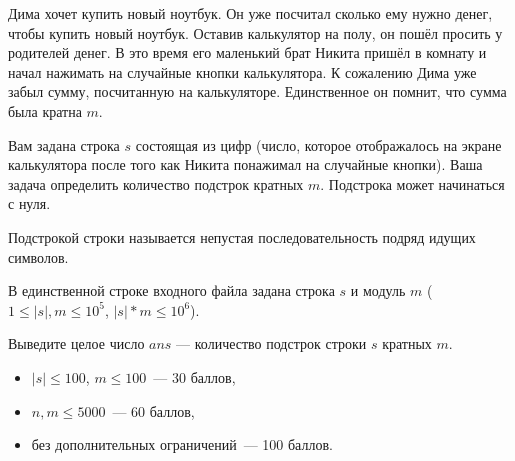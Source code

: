 
\Legend

Дима хочет купить новый ноутбук. Он уже посчитал сколько ему нужно денег, чтобы купить новый ноутбук. Оставив калькулятор на полу, он пошёл просить у родителей денег. В это время его маленький брат Никита пришёл в комнату и начал нажимать на случайные кнопки калькулятора. К сожалению Дима уже забыл сумму, посчитанную на калькуляторе. Единственное он помнит, что сумма была кратна $m$.

Вам задана строка $s$ состоящая из цифр (число, которое отображалось на экране калькулятора после того как Никита понажимал на случайные кнопки). Ваша задача определить количество подстрок кратных $m$. Подстрока может начинаться с нуля.

Подстрокой строки называется непустая последовательность подряд идущих символов.

\Input
В единственной строке входного файла задана строка $s$ и модуль $m$ ($1 \le |s|, m \le 10^5$, $|s| * m \le 10^6$).

\Output
Выведите целое число $ans$ — количество подстрок строки $s$ кратных $m$.

\Samples
\BeginTests
\EndTests

\Scoring
\begin{itemize}
	\item $|s| \le 100$, $m \le 100$~--- 30 баллов,
	\item $n, m \le 5000$~--- 60 баллов,
	\item без дополнительных ограничений~--- 100 баллов.
\end{itemize}

\EndProblem
